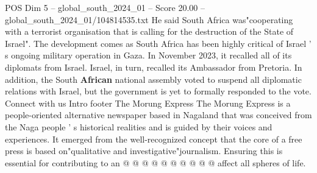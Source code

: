 \begin{textsample}{POS Dim 5 – global\_south\_2024\_01 – Score 20.00 – global\_south\_2024\_01/104814535.txt}
He said South Africa was"cooperating with a terrorist organisation that is calling for the destruction of the State of Israel".
The development comes as South Africa has been highly critical of Israel ' s ongoing military operation in Gaza.
In November 2023, it recalled all of its diplomats from Israel.
Israel, in turn, recalled its Ambassador from Pretoria.
In addition, the South \textbf{African} national assembly voted to suspend all diplomatic relations with Israel, but the government is yet to formally responded to the vote.
Connect with us Intro footer The Morung Express The Morung Express is a people-oriented alternative newspaper based in Nagaland that was conceived from the Naga people ' s historical realities and is guided by their voices and experiences.
It emerged from the well-recognized concept that the core of a free press is based on"qualitative and investigative"journalism.
Ensuring this is essential for contributing to an @ @ @ @ @ @ @ @ @ @ affect all spheres of life.

\end{textsample}
